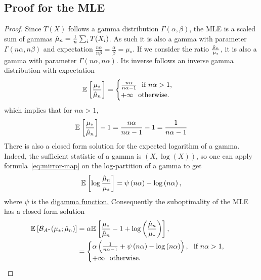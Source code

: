 \subsection{Proof for the MLE}
	\label{app:gammaMLE}
	
	\begin{proof}
	Since $T(X)$ follows a gamma distribution $\Gamma(\alpha, \beta)$, the MLE is a scaled sum of gammas $\hat \mu_n = \frac{1}{n} \sum_i T(X_i)$.
	As such it is also a gamma with parameter $\Gamma(n \alpha, n \beta)$ and expectation $\frac{n\alpha}{n\beta} = \frac{\alpha}{\beta} = \mu_*$.
	If we consider the ratio $\frac{\hat {\mu}_n}{\mu_*}$, it is also a gamma with parameter $\Gamma(n \alpha, n \alpha)$.
	Its inverse follows an inverse gamma distribution with expectation
	\begin{equation}
		\mathbb{E}_{} \left[ \frac{\mu_*}{\hat \mu_n} \right]  
		= \begin{cases}
			\frac{n\alpha}{n \alpha -1 }\ \text{ if } n\alpha > 1, \\
			+\infty \  \text{ otherwise. }
		\end{cases}
	\end{equation}
	which implies that for $n\alpha>1$, 
	\begin{align}
		\mathbb{E}_{} \left[ \frac{\mu_*}{\hat \mu_n} \right]  -1  
		= \frac{n \alpha}{n\alpha -1 } - 1
		= \frac{1}{n \alpha -1}
	\end{align}
	There is also a closed form solution for the expected logarithm of a gamma.
	Indeed, the sufficient statistic of a gamma is $(X, \log(X))$, so one can apply formula~\eqref{eq:mirror-map} on the log-partition of a gamma to get
	\begin{align}
		\mathbb{E}_{} \left[ \log \frac{\hat \mu_n}{\mu_*} \right]  
		= \psi\left(n \alpha\right) - \log\left(n \alpha\right),
	\end{align}
	where $\psi$ is the \href{https://en.wikipedia.org/wiki/Digamma_function}{digamma function.}
	Consequently the suboptimality of the MLE has a closed form solution
	\begin{align}
	\mathbb{E}_{} \left[ {\mathcal B}_{A^*}( \mu_*; \hat \mu_n)  \right] 
	&= \alpha \mathbb{E}_{} \left[ \frac{\mu_*}{ \hat \mu_n} - 1 + \log \left(\frac{\hat \mu_n}{\mu_*} \right)  \right] ,
	\\
	& =
	\begin{cases}
		\alpha \left( \frac{1}{n\alpha - 1} + \psi\left(n \alpha\right) - \log\left(n \alpha\right) \right), \ \text{ if } n\alpha>1, \\
			+\infty \  \text{ otherwise. }

\end{cases}
\end{align}
\end{proof}

